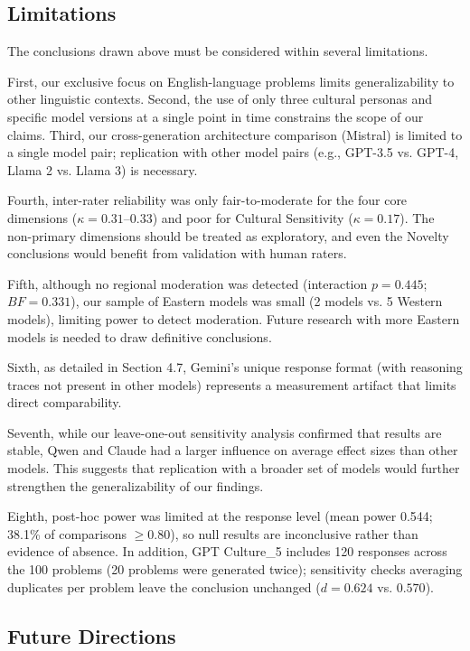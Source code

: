 \documentclass{article}
\begin{document}
\subsection{Limitations}

The conclusions drawn above must be considered within several limitations.

First, our exclusive focus on English-language problems limits generalizability to other linguistic contexts. Second, the use of only three cultural personas and specific model versions at a single point in time constrains the scope of our claims. Third, our cross-generation architecture comparison (Mistral) is limited to a single model pair; replication with other model pairs (e.g., GPT-3.5 vs. GPT-4, Llama 2 vs. Llama 3) is necessary.

Fourth, inter-rater reliability was only fair-to-moderate for the four core dimensions (\(\kappa = 0.31\)--\(0.33\)) and poor for Cultural Sensitivity (\(\kappa = 0.17\)). The non-primary dimensions should be treated as exploratory, and even the Novelty conclusions would benefit from validation with human raters.

Fifth, although no regional moderation was detected (interaction \(p = 0.445\); \(BF = 0.331\)), our sample of Eastern models was small (2 models vs. 5 Western models), limiting power to detect moderation. Future research with more Eastern models is needed to draw definitive conclusions.

Sixth, as detailed in Section 4.7, Gemini's unique response format (with reasoning traces not present in other models) represents a measurement artifact that limits direct comparability.

Seventh, while our leave-one-out sensitivity analysis confirmed that results are stable, Qwen and Claude had a larger influence on average effect sizes than other models. This suggests that replication with a broader set of models would further strengthen the generalizability of our findings.

Eighth, post-hoc power was limited at the response level (mean power 0.544; 38.1\% of comparisons \(\ge 0.80\)), so null results are inconclusive rather than evidence of absence. In addition, GPT Culture\_5 includes 120 responses across the 100 problems (20 problems were generated twice); sensitivity checks averaging duplicates per problem leave the conclusion unchanged (\(d = 0.624\) vs. \(0.570\)).

\subsection{Future Directions}
\end{document}
